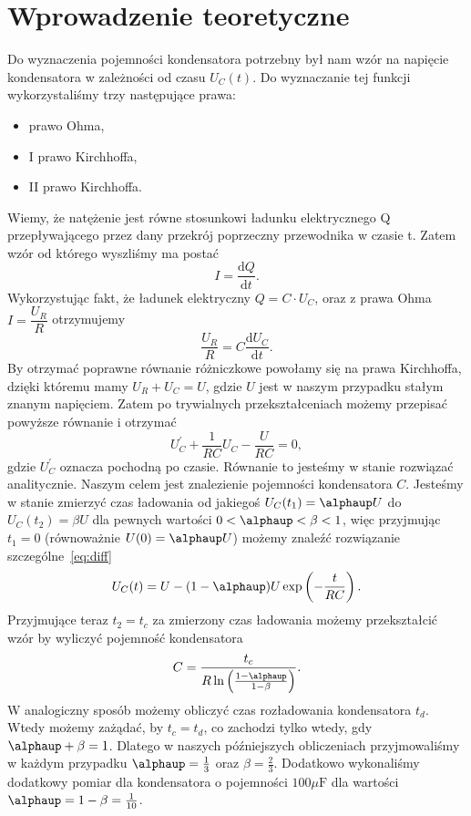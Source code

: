 \documentclass[12pt]{mwrep}
\let\alpha\alphaup
\newcommand{\dd}{\text{d}}
\begin{document}
	
	\section{Wprowadzenie teoretyczne} %
	\noindent Do wyznaczenia pojemności kondensatora potrzebny był nam wzór na napięcie kondensatora w zależności od czasu $U_C(t)$. Do wyznaczanie tej funkcji wykorzystaliśmy trzy następujące prawa:
	\begin{itemize}
		\item prawo Ohma,
		\item I prawo Kirchhoffa,
		\item II prawo Kirchhoffa.
	\end{itemize}
	\vspace*{0mm}Wiemy, że natężenie jest równe stosunkowi ładunku elektrycznego Q przepływającego przez dany przekrój poprzeczny przewodnika w czasie t. Zatem wzór od którego wyszliśmy ma postać
	\begin{equation}
		I=\frac{\dd Q}{\dd t}.
	\end{equation}
	Wykorzystując fakt, że ładunek elektryczny $Q=C\cdot U_C$, oraz z prawa Ohma $I=\dfrac{U_R}{R}$ otrzymujemy
	\begin{equation}
		\frac{U_R}{R}=C\frac{\dd U_C}{\dd t}.
	\end{equation} 
	By otrzymać poprawne równanie różniczkowe powołamy się na prawa Kirchhoffa, dzięki któremu mamy $U_R+U_C=U$, gdzie $U$ jest w naszym przypadku stałym znanym napięciem. Zatem po trywialnych przekształceniach możemy przepisać powyższe równanie i otrzymać
	\begin{equation}\label{eq:diff}
		U_C^\prime+\frac{1}{RC}U_C-\frac{U}{RC}=0,
	\end{equation}
	gdzie $U_C^\prime$ oznacza pochodną po czasie. Równanie to jesteśmy w stanie rozwiązać analitycznie. Naszym celem jest znalezienie pojemności kondensatora $C$. Jesteśmy w stanie zmierzyć czas ładowania od jakiegoś $U_C(t_1)=\alpha U$ do $U_C(t_2)=\beta U$ dla pewnych wartości $0<\alpha<\beta<1$, więc przyjmując $t_1=0$ (równoważnie $U(0)=\alpha U$) możemy znaleźć rozwiązanie szczególne~\eqref{eq:diff} 
	\begin{equation}
		U_C(t)=U-(1-\alpha)U\exp\left(-\frac{t}{RC}\right).
	\end{equation}
	Przyjmujące teraz $t_2=t_c$ za zmierzony czas ładowania możemy przekształcić wzór by wyliczyć pojemność kondensatora
	\begin{equation}\label{eq:C}
		C=\frac{t_c}{R\ln\left(\frac{1-\alpha}{1-\beta}\right)}.
	\end{equation}
	W analogiczny sposób możemy obliczyć czas rozładowania kondensatora $t_d$. Wtedy możemy zażądać, by $t_c=t_d$, co zachodzi tylko wtedy, gdy $\alpha+\beta=1$. Dlatego w naszych późniejszych obliczeniach przyjmowaliśmy w każdym przypadku $\alpha=\frac{1}{3}$ oraz $\beta=\frac{2}{3}$. Dodatkowo wykonaliśmy dodatkowy pomiar dla kondensatora o pojemności $100\mu \text{F}$ dla wartości $\alpha=1-\beta=\frac{1}{10}$.
	
\end{document}
